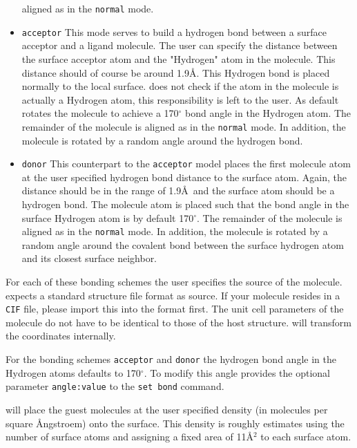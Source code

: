 \begin{itemize}
      aligned as in the {\tt normal} mode.
\item {\tt acceptor} This mode serves to build a hydrogen bond 
      between a surface acceptor and a ligand molecule. 
      The user can specify the distance between the 
      surface acceptor atom and the "Hydrogen" atom in the molecule.
      This distance should of course be around 1.9\AA. This
      Hydrogen bond is placed normally to the local surface. \Discus 
      does not check if the atom in the molecule is actually a 
      Hydrogen atom, this responsibility is left to the user.
      As default \Discus rotates the molecule to achieve a 170$^\circ$
      bond angle in the Hydrogen atom.
      The remainder of the molecule is 
      aligned as in the {\tt normal} mode. In addition, the molecule
      is rotated by a random angle around the hydrogen bond.
\item {\tt donor} This counterpart to the {\tt acceptor} model 
      places the first molecule atom at the user specified hydrogen
      bond distance to the surface atom. Again, the distance should 
      be in the range of 1.9\AA\  and the surface atom should be a 
      hydrogen bond. The molecule atom is placed such that the 
      bond angle in the surface Hydrogen atom is by default
      170$^\circ$.
      The remainder of the molecule is 
      aligned as in the {\tt normal} mode. In addition, the molecule
      is rotated by a random angle around the covalent bond between 
      the surface hydrogen atom and its closest surface neighbor.
\end{itemize}

For each of these bonding schemes the user specifies the source of
the molecule. \Discus expects a standard structure file format as 
source. If your molecule resides in a {\tt CIF} file, please 
import this into the \Discus format first. The unit cell parameters
of the molecule do not have to be identical to those of the host
structure. \Discus will transform the coordinates internally.

For the bonding schemes {\tt acceptor} and {\tt donor} the 
hydrogen bond angle in the Hydrogen atoms defaults to 170$^\circ$.
To modify this angle \Discus provides the optional parameter
{\tt angle:value} to the {\tt set bond} command. 

\Discus will place the guest molecules at the user specified density 
(in molecules per square \AA ngstroem) onto the surface. This density
is roughly estimates using the number of surface atoms and assigning a
fixed area of 11\AA$^2$ to each surface atom. 

